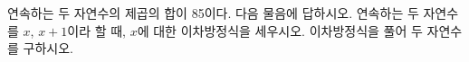 연속하는 두 자연수의 제곱의 합이 85이다. 다음 물음에 답하시오.
 연속하는 두 자연수를 $x$, $x+1$이라 할 때, $x$에 대한 이차방정식을 세우시오.
 이차방정식을 풀어 두 자연수를 구하시오.
